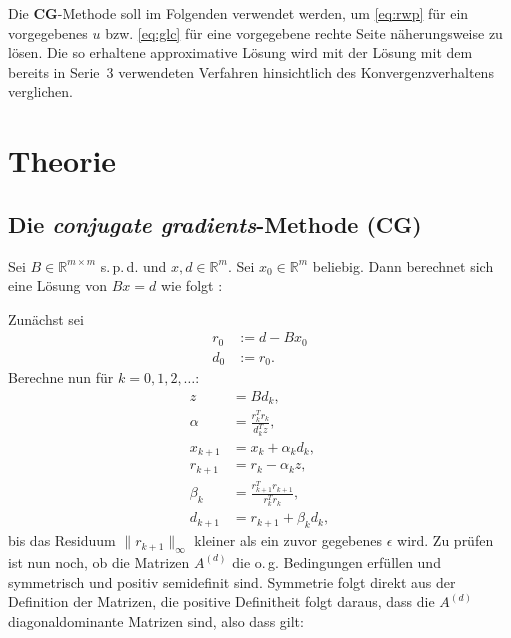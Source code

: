 \documentclass[smallheadings]{scrartcl}
\numberwithin{equation}{section}
\begin{document}
Die \textbf{CG}-Methode soll im Folgenden verwendet werden, um \eqref{eq:rwp} für ein vorgegebenes $u$ bzw. \eqref{eq:glc} für eine vorgegebene rechte Seite näherungsweise zu lösen. Die so erhaltene approximative Lösung wird mit der Lösung mit dem bereits in Serie~3 verwendeten Verfahren hinsichtlich des Konvergenzverhaltens verglichen. 

\section{Theorie}

\subsection{Die \emph{conjugate gradients}-Methode (\textbf{CG})}

Sei $B \in \mathbb{R}^{m\times m}$ s.\,p.\,d. und $x,d\in \mathbb{R}^m$. Sei $x_0\in \mathbb{R}^m$ beliebig. Dann berechnet sich eine Lösung von $Bx=d$ wie folgt \cite{wiki:cg}:


Zunächst sei 
\begin{align}
r_0&:=d-Bx_0\\
d_0&:=r_0.
\end{align}
Berechne nun für $k=0,1,2,\dots$:
\begin{align}
z&=Bd_k,\\
\alpha&=\frac{r_k^Tr_k}{d_k^Tz},\\
x_{k+1}&=x_k+\alpha_kd_k,\\
r_{k+1}&=r_k-\alpha_kz,\\
\beta_k&=\frac{r^T_{k+1}r_{k+1}}{r^T_{k}r_{k}},\\
d_{k+1}&=r_{k+1}+\beta_kd_k,
\end{align}
bis das Residuum $\|r_{k+1}\|_\infty$ kleiner als ein zuvor gegebenes $\epsilon$ wird.
Zu prüfen ist nun noch, ob die Matrizen $A^{(d)}$ die o.\,g. Bedingungen erfüllen und symmetrisch und positiv semidefinit sind. Symmetrie folgt direkt aus der Definition der Matrizen, die positive Definitheit folgt daraus, dass die $A^{(d)}$ diagonaldominante Matrizen sind, also dass gilt:
\end{document}
